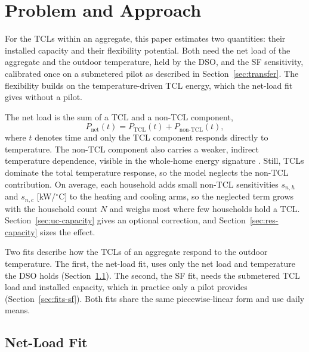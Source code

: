 \section{Problem and Approach}
\label{sec:problem}
\label{sec:fits}

For the TCLs within an aggregate, this paper estimates two quantities: their installed capacity and their flexibility potential. Both need the net load of the aggregate and the outdoor temperature, held by the DSO, and the SF sensitivity, calibrated once on a submetered pilot as described in Section~\ref{sec:transfer}. The flexibility builds on the temperature-driven TCL energy, which the net-load fit gives without a pilot.

The net load is the sum of a TCL and a non-TCL component,
\begin{equation}
P_{\mathrm{net}}(t) = P_{\mathrm{TCL}}(t) + P_{\text{non-TCL}}(t),
\label{eq:decomp}
\end{equation}
where $t$ denotes time and only the TCL component responds directly to temperature. The non-TCL component also carries a weaker, indirect temperature dependence, visible in the whole-home energy signature \cite{Wes20}. Still, TCLs dominate the total temperature response, so the model neglects the non-TCL contribution. On average, each household adds small non-TCL sensitivities $s_{n,h}$ and $s_{n,c}$ [kW/$^\circ$C] to the heating and cooling arms, so the neglected term grows with the household count $N$ and weighs most where few households hold a TCL. Section~\ref{sec:uc-capacity} gives an optional correction, and Section~\ref{sec:res-capacity} sizes the effect.

Two fits describe how the TCLs of an aggregate respond to the outdoor temperature. The first, the net-load fit, uses only the net load and temperature the DSO holds (Section~\ref{sec:fits-net}). The second, the SF fit, needs the submetered TCL load and installed capacity, which in practice only a pilot provides (Section~\ref{sec:fits-sf}). Both fits share the same piecewise-linear form and use daily means.

\subsection{Net-Load Fit}
\label{sec:fits-net}

